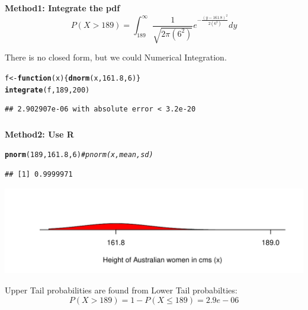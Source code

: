 \documentclass[t,xcolor=pdftex,dvipsnames,table]{beamer}
\makeatletter
\def\maxwidth{ %
  \ifdim\Gin@nat@width>\linewidth
    \linewidth
  \else
    \Gin@nat@width
  \fi
}
\newcommand{\hlnum}[1]{\textcolor[rgb]{0.686,0.059,0.569}{#1}}%
\newcommand{\hlcom}[1]{\textcolor[rgb]{0.678,0.584,0.686}{\textit{#1}}}%
\newcommand{\hlstd}[1]{\textcolor[rgb]{0.345,0.345,0.345}{#1}}%
\newcommand{\hlkwa}[1]{\textcolor[rgb]{0.161,0.373,0.58}{\textbf{#1}}}%
\newcommand{\hlkwb}[1]{\textcolor[rgb]{0.69,0.353,0.396}{#1}}%
\newcommand{\hlkwc}[1]{\textcolor[rgb]{0.333,0.667,0.333}{#1}}%
\newcommand{\hlkwd}[1]{\textcolor[rgb]{0.737,0.353,0.396}{\textbf{#1}}}%
\newenvironment{kframe}{%
 \def\at@end@of@kframe{}%
 \ifinner\ifhmode%
  \def\at@end@of@kframe{\end{minipage}}%
  \begin{minipage}{\columnwidth}%
 \fi\fi%
 \def\FrameCommand##1{\hskip\@totalleftmargin \hskip-\fboxsep
 \colorbox{shadecolor}{##1}\hskip-\fboxsep
     \hskip-\linewidth \hskip-\@totalleftmargin \hskip\columnwidth}%
 \MakeFramed {\advance\hsize-\width
   \@totalleftmargin\z@ \linewidth\hsize
   \@setminipage}}%
 {\par\unskip\endMakeFramed%
 \at@end@of@kframe}
\newenvironment{knitrout}{}{} %
\makeatother
\begin{document}
\begin{frame}[fragile]\frametitle{}
{\bf Method1: Integrate the pdf} \\

\[ P(X > 189) = \int_{189}^{\infty} \frac{1}{  \sqrt{2 \pi (6^2)}}  e^{   -\frac{ (y-161.8)^2 }{2 (6^2)  } } dy \]


\vspace{1cm}
There is no closed form, but we could Numerical Integration.
\begin{knitrout}
\color{fgcolor}\begin{kframe}
\begin{alltt}
\hlstd{f} \hlkwb{<-} \hlkwa{function}\hlstd{(}\hlkwc{x}\hlstd{) \{}\hlkwd{dnorm}\hlstd{(x,}\hlnum{161.8}\hlstd{,}\hlnum{6}\hlstd{)\}}
\hlkwd{integrate}\hlstd{(f,}\hlnum{189}\hlstd{,}\hlnum{200}\hlstd{)}
\end{alltt}
\begin{verbatim}
## 2.902907e-06 with absolute error < 3.2e-20
\end{verbatim}
\end{kframe}
\end{knitrout}
\end{frame}


\begin{frame}[fragile]\frametitle{}

{\bf Method2: Use R}

\begin{knitrout}
\color{fgcolor}\begin{kframe}
\begin{alltt}
\hlkwd{pnorm}\hlstd{(}\hlnum{189}\hlstd{,}\hlnum{161.8}\hlstd{,}\hlnum{6}\hlstd{)}  \hlcom{#pnorm(x,mean,sd) }
\end{alltt}
\begin{verbatim}
## [1] 0.9999971
\end{verbatim}
\end{kframe}
\end{knitrout}

\begin{knitrout}
\color{fgcolor}
\includegraphics[width=\maxwidth]{figure/unnamed-chunk-11-1} 

\end{knitrout}

Upper Tail probabilities are found from Lower Tail probabilties:
\[ P(X > 189) = 1- P(X \leq 189) = 2.9e-06 \]

\end{frame}
\end{document}
